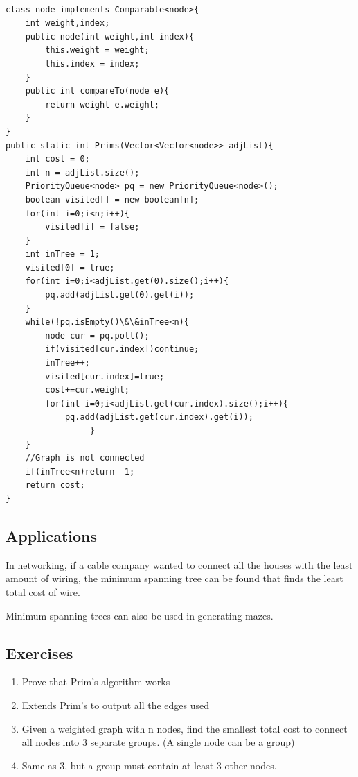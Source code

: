 \documentclass[11pt,oneside]{book}
\begin{document}
\begin{lstlisting}

class node implements Comparable<node>{
    int weight,index;
    public node(int weight,int index){
        this.weight = weight;
        this.index = index;
    }
    public int compareTo(node e){
        return weight-e.weight;
    }
}
public static int Prims(Vector<Vector<node>> adjList){
    int cost = 0;
    int n = adjList.size();
    PriorityQueue<node> pq = new PriorityQueue<node>();
    boolean visited[] = new boolean[n];
    for(int i=0;i<n;i++){
        visited[i] = false;
    }
    int inTree = 1;
    visited[0] = true;
    for(int i=0;i<adjList.get(0).size();i++){
        pq.add(adjList.get(0).get(i));
    }
    while(!pq.isEmpty()\&\&inTree<n){
        node cur = pq.poll();
        if(visited[cur.index])continue;
        inTree++;
        visited[cur.index]=true;
        cost+=cur.weight;
        for(int i=0;i<adjList.get(cur.index).size();i++){
            pq.add(adjList.get(cur.index).get(i));          
                 }
    }
    //Graph is not connected
    if(inTree<n)return -1;
    return cost;
}
\end{lstlisting}

\subsection{Applications}

In networking, if a cable company wanted to connect all the houses with the least amount of wiring, the minimum spanning tree can be found that finds the least total cost of wire.

Minimum spanning trees can also be used in generating mazes.

\subsection{Exercises}

\begin{enumerate}
\item Prove that Prim's algorithm works
\item Extends Prim's to output all the edges used
\item Given a weighted graph with n nodes, find the smallest total cost to connect all nodes into 3 separate groups. (A single node can be a group)
\item Same as 3, but a group must contain at least 3 other nodes.
\end{enumerate}
\end{document}
